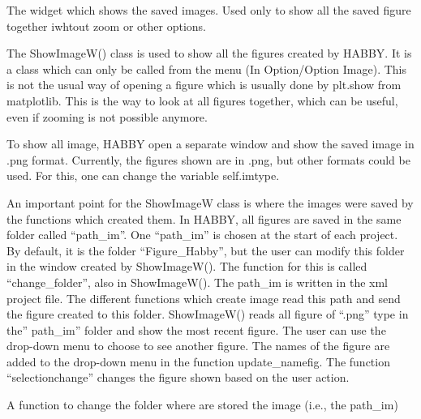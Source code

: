 \documentclass[letterpaper,10pt,english]{sphinxmanual}
\begin{document}

\begin{fulllineitems}
\label{\detokenize{index:src_GUI.Main_windows_1.ShowImageW}}
The widget which shows the saved images. Used only to show all the saved figure together iwhtout zoom or other
options.


The ShowImageW() class is used to show all the figures created by HABBY. It is a class which can only be
called from the menu (In Option/Option Image). This is not the usual way of opening a figure which is usually done
by plt.show from matplotlib. This is the way to look at all figures  together, which can be useful, even if zooming
is not possible anymore.

To show all image, HABBY open a separate window and show the saved image in .png format.  Currently, the figures
shown are in .png, but other formats could be used. For this, one can change the variable self.imtype.

An important point for the ShowImageW  class  is where the images were saved by the functions which created them.
In HABBY, all figures are saved in the same folder called “path\_im”. One “path\_im” is chosen at the start of each
project. By default, it is the folder “Figure\_Habby”, but the user can modify this folder in the window created by
ShowImageW(). The function for this is called “change\_folder”, also in ShowImageW(). The path\_im is written in
the xml project file. The different functions which create image read this path and send the figure created
to this folder. ShowImageW() reads all  figure of “.png” type in the” path\_im” folder and show the most recent
figure. The user can use the drop-down menu to choose to see another figure. The names of the figure are added to
the drop-down menu in the function update\_namefig. The function ``selectionchange'' changes the figure shown based
on the user action.

\begin{fulllineitems}
\label{\detokenize{index:src_GUI.Main_windows_1.ShowImageW.change_folder}}
A function to change the folder where are stored the image (i.e., the path\_im)


\end{fulllineitems}
\end{fulllineitems}
\end{document}
